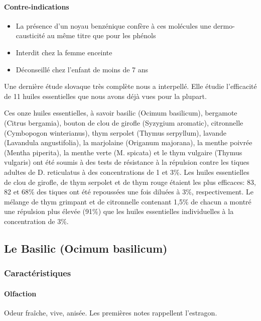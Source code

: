 \documentclass[12pt,a4wide]{article}
\begin{document}
\paragraph{Contre-indications}
\label{sec-4-3-4-1}
\begin{itemize}
\item La présence d'un noyau benzénique confère à ces molécules une dermo-causticité
au même titre que pour les phénols
\item Interdit chez la femme enceinte
\item Déconseillé chez l'enfant de moins de 7 ans
\end{itemize}

Une  dernière  étude slovaque  très  complète  nous  a interpellé.  Elle  étudie
l'efficacité de 11 huiles essentielles que nous avons déjà vues pour la plupart.


Ces onze  huiles essentielles,  à savoir  basilic (Ocimum  basilicum), bergamote
(Citrus bergamia),  bouton de clou  de girofle (Syzygium  aromatic), citronnelle
(Cymbopogon winterianus),  thym serpolet (Thymus serpyllum),  lavande (Lavandula
angustifolia),  la marjolaine  (Origanum  majorana), la  menthe poivrée  (Mentha
piperita), la  menthe verte (M. spicata)  et le thym vulgaire  (Thymus vulgaris)
ont  été soumis  à des  tests de  résistance à  la répulsion  contre les  tiques
adultes  de  D.  reticulatus  à  des  concentrations de  1  et  3\%.  Les  huiles
essentielles de clou de  girofle, de thym serpolet et de  thym rouge étaient les
plus efficaces: 83, 82  et 68\% des tiques ont été repoussées  une fois diluées à
3\%, respectivement. Le mélange de thym grimpant et de citronnelle contenant 1,5\%
de chacun a  montré une répulsion plus élevée (91\%)  que les huiles essentielles
individuelles à la concentration de 3\%.

\subsection{Le Basilic (Ocimum basilicum)}
\label{sec-4-4}

\subsubsection{Caractéristiques}
\label{sec-4-4-1}

\paragraph{Olfaction}
\label{sec-4-4-1-1}
Odeur fraîche, vive, anisée. Les premières notes rappellent l'estragon.
\end{document}
